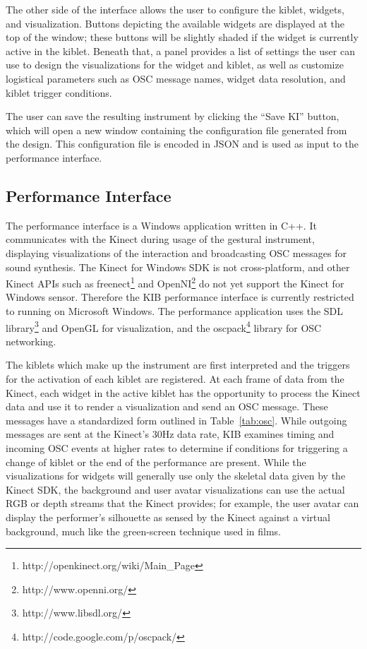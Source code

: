 \documentclass{nime-alternate}
\begin{document}
The other side of the interface allows the user to configure the kiblet, widgets, and visualization.
Buttons depicting the available widgets are displayed at the top of the window; these buttons will be
slightly shaded if the widget is currently active in the kiblet. Beneath that, a panel provides a list of
settings the user can use to design the visualizations for the widget and kiblet, as well as customize logistical
parameters such as OSC message names, widget data resolution, and kiblet trigger conditions.

The user can save the resulting instrument by clicking the ``Save KI'' button, which will open
a new window containing the configuration file generated from the design. This configuration
file is encoded in JSON and is used as input to the performance interface.
\subsection{Performance Interface}

The performance interface is a Windows application written in C++. It communicates with the Kinect during usage of the gestural instrument,
displaying visualizations of the interaction and broadcasting OSC messages for sound synthesis. The Kinect
for Windows SDK is not cross-platform, and other Kinect APIs such as freenect\footnote{http://openkinect.org/wiki/Main\_Page} and OpenNI\footnote{http://www.openni.org/} do not yet support
the Kinect for Windows sensor. Therefore the KIB performance interface is currently restricted
to running on Microsoft Windows. The performance application uses the SDL library\footnote{http://www.libsdl.org/} and OpenGL
for visualization, and the oscpack\footnote{http://code.google.com/p/oscpack/} library for
OSC networking. 

The kiblets which make up the instrument are first interpreted and the triggers for the activation of
each kiblet are registered. At each frame of data from the Kinect, each widget in the active kiblet 
has the opportunity to process the Kinect data and use it to render a visualization and send an OSC message. 
These messages have a standardized form outlined in Table~\ref{tab:osc}. While outgoing messages are
sent at the Kinect's 30Hz data rate, KIB examines timing and incoming OSC events at higher rates 
to determine if conditions for triggering a change of kiblet or the end of the performance
are present.
While the visualizations for widgets will generally use only the skeletal data given by the
Kinect SDK, the background and user avatar visualizations can use the actual RGB or depth streams
that the Kinect provides; for example, the user avatar can display the performer's silhouette as
sensed by the Kinect against a virtual background, much like the green-screen technique used in films.
\end{document}
